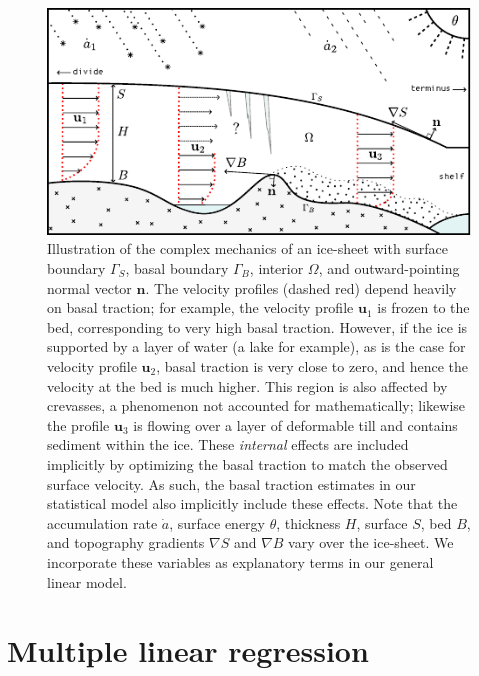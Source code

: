\begin{figure}
  \centering
    \includegraphics[width=\linewidth]{images/ice_profile.pdf}
	\caption[Basal sliding diagram]{Illustration of the complex mechanics of an ice-sheet with surface boundary $\Gamma_S$, basal boundary $\Gamma_B$, interior $\Omega$, and outward-pointing normal vector $\mathbf{n}$.  The velocity profiles (dashed red) depend heavily on basal traction; for example, the velocity profile $\mathbf{u}_1$ is frozen to the bed, corresponding to very high basal traction.  However, if the ice is supported by a layer of water (a lake for example), as is the case for velocity profile $\mathbf{u}_2$, basal traction is very close to zero, and hence the velocity at the bed is much higher.  This region is also affected by crevasses, a phenomenon not accounted for mathematically; likewise the profile $\mathbf{u}_3$ is flowing over a layer of deformable till and contains sediment within the ice.  These \emph{internal} effects are included implicitly by optimizing the basal traction to match the observed surface velocity.  As such, the basal traction estimates in our statistical model also implicitly include these effects.  Note that the accumulation rate $\dot{a}$, surface energy $\theta$, thickness $H$, surface $S$, bed $B$, and topography gradients $\nabla S$ and $\nabla B$ vary over the ice-sheet.  We incorporate these variables as explanatory terms in our general linear model.}
\end{figure}

\section{Multiple linear regression}

